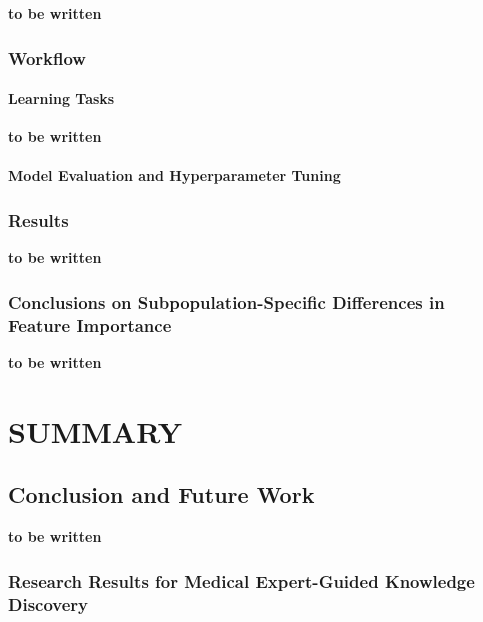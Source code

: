 \documentclass[
  oneside]{book}
\begin{document}
\textbf{to be written}

\hypertarget{gender-workflow}{%
\section{Workflow}\label{gender-workflow}}

\hypertarget{learning-tasks}{%
\subsection{Learning Tasks}\label{learning-tasks}}

\textbf{to be written}

\hypertarget{model-evaluation-and-hyperparameter-tuning}{%
\subsection{Model Evaluation and Hyperparameter Tuning}\label{model-evaluation-and-hyperparameter-tuning}}

\hypertarget{gender-results}{%
\section{Results}\label{gender-results}}

\textbf{to be written}

\hypertarget{gender-conclusions}{%
\section{Conclusions on Subpopulation-Specific Differences in Feature Importance}\label{gender-conclusions}}

\textbf{to be written}

\hypertarget{part-summary}{%
\part{SUMMARY}\label{part-summary}}

\hypertarget{summary}{%
\chapter{Conclusion and Future Work}\label{summary}}

\textbf{to be written}

\hypertarget{summary-results}{%
\section{Research Results for Medical Expert-Guided Knowledge Discovery}\label{summary-results}}
\end{document}
